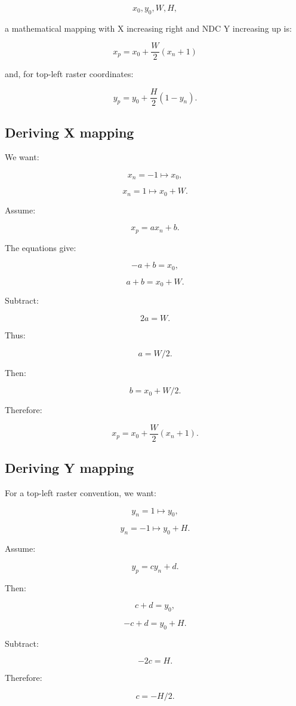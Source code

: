 \[
 x_0,y_0,W,H,
\]

a mathematical mapping with X increasing right and NDC Y increasing up is:

\[
 \boxed{ x_p=x_0+\frac W2(x_n+1) }
\]

and, for top-left raster coordinates:

\[
 \boxed{ y_p=y_0+\frac H2(1-y_n) }.
\]

\subsection{Deriving X mapping}\label{02-foundations-ii-ch033-deriving-x-mapping}

We want:

\[
 x_n=-1\mapsto x_0,
\]

\[
 x_n=1\mapsto x_0+W.
\]

Assume:

\[
 x_p=ax_n+b.
\]

The equations give:

\[
 -a+b=x_0,
\]

\[
 a+b=x_0+W.
\]

Subtract:

\[
 2a=W.
\]

Thus:

\[
 a=W/2.
\]

Then:

\[
 b=x_0+W/2.
\]

Therefore:

\[
 \boxed{ x_p=x_0+\frac W2(x_n+1) }.
\]

\subsection{Deriving Y mapping}\label{02-foundations-ii-ch033-deriving-y-mapping}

For a top-left raster convention, we want:

\[
 y_n=1\mapsto y_0,
\]

\[
 y_n=-1\mapsto y_0+H.
\]

Assume:

\[
 y_p=cy_n+d.
\]

Then:

\[
 c+d=y_0,
\]

\[
 -c+d=y_0+H.
\]

Subtract:

\[
 -2c=H.
\]

Therefore:

\[
 c=-H/2.
\]

